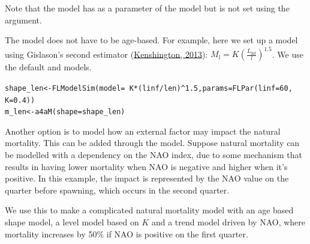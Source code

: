 \documentclass[a4paper,english,10pt]{article}\usepackage[]{graphicx}\usepackage[]{color}
\makeatletter
\newcommand{\hlnum}[1]{\textcolor[rgb]{0.063,0.58,0.627}{#1}}%
\newcommand{\hlopt}[1]{\textcolor[rgb]{0.196,0.196,0.196}{#1}}%
\newcommand{\hlstd}[1]{\textcolor[rgb]{0.196,0.196,0.196}{#1}}%
\newcommand{\hlkwb}[1]{\textcolor[rgb]{0.627,0,0.314}{#1}}%
\newcommand{\hlkwc}[1]{\textcolor[rgb]{0,0.631,0.314}{#1}}%
\newcommand{\hlkwd}[1]{\textcolor[rgb]{0.78,0.227,0.412}{#1}}%
\newenvironment{kframe}{%
 \def\at@end@of@kframe{}%
 \ifinner\ifhmode%
  \def\at@end@of@kframe{\end{minipage}}%
  \begin{minipage}{\columnwidth}%
 \fi\fi%
 \def\FrameCommand##1{\hskip\@totalleftmargin \hskip-\fboxsep
 \colorbox{shadecolor}{##1}\hskip-\fboxsep
     \hskip-\linewidth \hskip-\@totalleftmargin \hskip\columnwidth}%
 \MakeFramed {\advance\hsize-\width
   \@totalleftmargin\z@ \linewidth\hsize
   \@setminipage}}%
 {\par\unskip\endMakeFramed%
 \at@end@of@kframe}
\newenvironment{knitrout}{}{} %
\makeatother
\begin{document}
Note that the  model has  as a parameter of the model but is not set using the  argument.

The  model does not have to be age-based. For example, here we set up a  model using Gislason's second estimator (\href{}{Kenshington, 2013}):
$M_l=K(\frac{L_{\inf}}{l})^{1.5}$. We use the default  and  models.

\begin{knitrout}
\color{fgcolor}\begin{kframe}
\begin{alltt}
\hlstd{shape_len} \hlkwb{<-} \hlkwd{FLModelSim}\hlstd{(}\hlkwc{model} \hlstd{=} \hlopt{~}\hlstd{K} \hlopt{*} \hlstd{(linf}\hlopt{/}\hlstd{len)}\hlopt{^}\hlnum{1.5}\hlstd{,} \hlkwc{params} \hlstd{=} \hlkwd{FLPar}\hlstd{(}\hlkwc{linf} \hlstd{=} \hlnum{60}\hlstd{,}
    \hlkwc{K} \hlstd{=} \hlnum{0.4}\hlstd{))}
\hlstd{m_len} \hlkwb{<-} \hlkwd{a4aM}\hlstd{(}\hlkwc{shape} \hlstd{= shape_len)}
\end{alltt}
\end{kframe}
\end{knitrout}

Another option is to model how an external factor may impact the natural mortality. This can be added through the  model. Suppose natural mortality can be modelled with a dependency on the NAO index, due to some mechanism that results in having lower mortality when NAO is negative and higher when it's positive. In this example, the impact is represented by the NAO value on the quarter before spawning, which occurs in the second quarter. 

We use this to make a complicated natural mortality model with an age based shape model, a level model based on $K$ and a trend model driven by NAO, where mortality increases by 50\% if NAO is positive on the first quarter.
\end{document}
